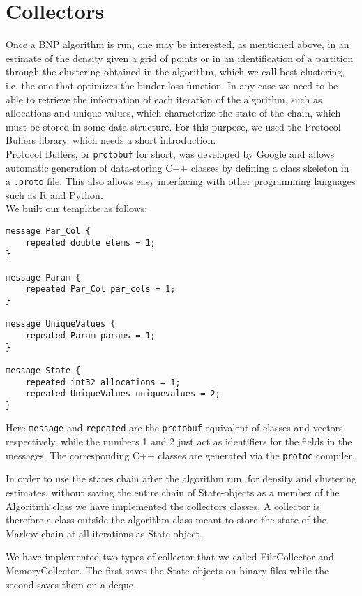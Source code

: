 \chapter{Collectors}

Once a BNP algorithm is run, one may be interested, as mentioned above, in an estimate of the density given a grid of points or in an identification of a partition through the clustering obtained in the algorithm, which we call best clustering, i.e. the one that optimizes the binder loss function. In any case we need to be able to retrieve the information of each iteration of the algorithm, such as allocations and unique values, which characterize the state of the chain, which must be stored in some data structure.
For this purpose, we used the Protocol Buffers library, which needs a short introduction. \\
Protocol Buffers, or \verb|protobuf| for short, was developed by Google and allows automatic generation of data-storing C++ classes by defining a class skeleton in a \verb|.proto| file.
This also allows easy interfacing with other programming languages such as R and Python. \\
We built our template as follows:
\begin{verbatim}
message Par_Col {
    repeated double elems = 1;
}

message Param {
    repeated Par_Col par_cols = 1;
}

message UniqueValues {
    repeated Param params = 1;
}

message State {
    repeated int32 allocations = 1;
    repeated UniqueValues uniquevalues = 2;
}
\end{verbatim}
Here \verb|message| and \verb|repeated| are the \verb|protobuf| equivalent of classes and vectors respectively, while the numbers 1 and 2 just act as identifiers for the fields in the messages.
The corresponding C++ classes are generated via the \verb|protoc| compiler.


In order to use the states chain after the algorithm run, for density and clustering estimates, without saving the entire chain of State-objects as a member of the Algoritmh class we have implemented the collectors classes. 
A collector is therefore a class outside the algorithm class meant to store the state of the Markov chain at all iterations as State-object.


We have implemented two types of collector that we called FileCollector and MemoryCollector.
The first saves the State-objects on binary files while the second saves them on a deque.

